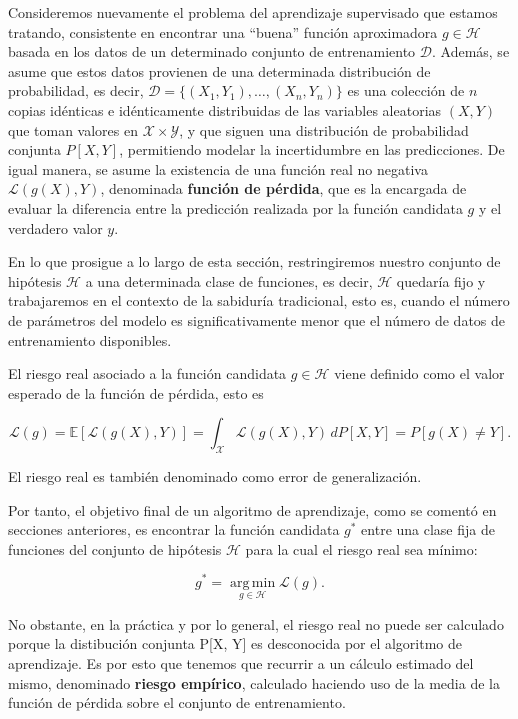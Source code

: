 Consideremos nuevamente el problema del aprendizaje supervisado que estamos tratando, consistente en encontrar una ``buena'' función aproximadora $g \in \mathcal{H}$ basada en los datos de un determinado conjunto de entrenamiento $\mathcal{D}$. Además, se asume que estos datos provienen de una determinada distribución de probabilidad, es decir, $\mathcal{D} = \{(X_{1}, Y_{1}), \ldots, (X_{n}, Y_{n})\}$ es una colección de $n$ copias idénticas e idénticamente distribuidas de las variables aleatorias $(X, Y)$ que toman valores en $\mathcal{X} \times \mathcal{Y}$, y que siguen una distribución de probabilidad conjunta $P[X, Y]$, permitiendo modelar la incertidumbre en las predicciones. De igual manera, se asume la existencia de una función real no negativa $\mathcal{L}(g(X), Y)$, denominada \textbf{función de pérdida}, que es la encargada de evaluar la diferencia entre la predicción realizada por la función candidata $g$ y el verdadero valor $y$.

En lo que prosigue a lo largo de esta sección, restringiremos nuestro conjunto de hipótesis $\mathcal{H}$ a una determinada clase de funciones, es decir, $\mathcal{H}$ quedaría fijo y trabajaremos en el contexto de la sabiduría tradicional, esto es, cuando el número de parámetros del modelo es significativamente menor que el número de datos de entrenamiento disponibles.

\begin{definicion}\label{def:riesgo-real}
    El riesgo real asociado a la función candidata $g \in \mathcal{H}$ viene definido como el valor esperado de la función de pérdida, esto es

    \[ \mathcal{L}(g) = \mathbb{E}[\mathcal{L}(g(X), Y)] = \int_{\mathcal{X}} \mathcal{L}(g(X), Y) \, dP[X, Y] = P[g(X) \neq Y].\]

    El riesgo real es también denominado como error de generalización.
\end{definicion}

Por tanto, el objetivo final de un algoritmo de aprendizaje, como se comentó en secciones anteriores, es encontrar la función candidata $g^{*}$ entre una clase fija de funciones del conjunto de hipótesis $\mathcal{H}$ para la cual el riesgo real sea mínimo:

\[ g^{*} = \operatorname*{\arg \,\min}_{g \in \mathcal{H}} \mathcal{L}(g). \]

No obstante, en la práctica y por lo general, el riesgo real no puede ser calculado porque la distibución conjunta P[X, Y] es desconocida por el algoritmo de aprendizaje. Es por esto que tenemos que recurrir a un cálculo estimado del mismo, denominado \textbf{riesgo empírico}, calculado haciendo uso de la media de la función de pérdida sobre el conjunto de entrenamiento.

